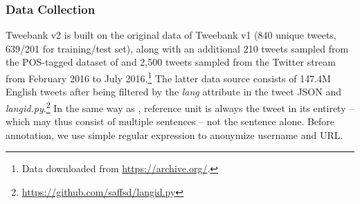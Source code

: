 \documentclass[11pt,a4paper]{article}
\begin{document}
\subsubsection{Data Collection}
{\sc Tweebank v2} is built on the original data of {\sc Tweebank v1}
(840 unique tweets, 639/201 for training/test set), along with an 
additional 210 tweets sampled from the POS-tagged dataset of
 and 2,500 tweets sampled
from the Twitter stream from February 2016 to July 2016.\footnote{Data downloaded from \url{https://archive.org/}.}
The latter data source consists of 147.4M English tweets after being
filtered by the {\it lang} attribute in the tweet JSON and {\it
  langid.py}.\footnote{\url{https://github.com/saffsd/langid.py}}
In the same way as \citet{kong-EtAl:2014:EMNLP2014},
reference unit is always the tweet in its entirety
-- which may thus consist of multiple sentences -- not the sentence alone.
Before annotation, we use simple regular expression to anonymize username and URL.

\end{document}
